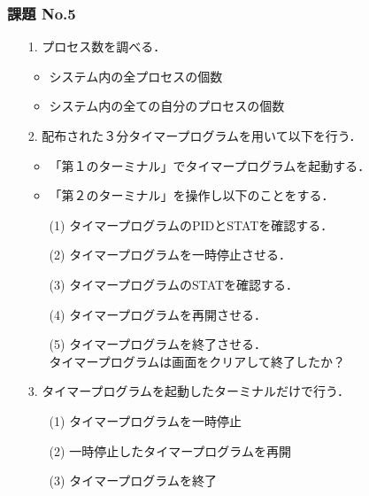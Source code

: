\documentclass{beamer}                 %
\begin{document}
\begin{frame}[fragile]
  \frametitle{課題 No.5}
  \begin{enumerate}
    \item[1.] プロセス数を調べる．
    \begin{itemize}
      \item システム内の全プロセスの個数
      \item システム内の全ての自分のプロセスの個数
    \end{itemize}
    \item[2.] 配布された３分タイマープログラムを用いて以下を行う．
    \begin{itemize}
      \item 「第１のターミナル」でタイマープログラムを起動する．
      \item 「第２のターミナル」を操作し以下のことをする．
    \end{itemize}
    \begin{enumerate}
      \item[(1)] タイマープログラムのPIDとSTATを確認する．
      \item[(2)] タイマープログラムを一時停止させる．
      \item[(3)] タイマープログラムのSTATを確認する．
      \item[(4)] タイマープログラムを再開させる．
      \item[(5)] タイマープログラムを終了させる．\\
       タイマープログラムは画面をクリアして終了したか？
    \end{enumerate}
    \item[3.] タイマープログラムを起動したターミナルだけで行う．
    \begin{enumerate}
      \item[(1)] タイマープログラムを一時停止
      \item[(2)] 一時停止したタイマープログラムを再開
      \item[(3)] タイマープログラムを終了
    \end{enumerate}
  \end{enumerate}
\end{frame}
\end{document}
